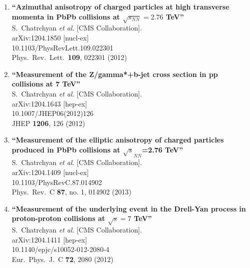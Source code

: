\documentclass{article}
\begin{document}
\begin{enumerate}
\item%
{\bf ``Azimuthal anisotropy of charged particles at high transverse momenta in PbPb collisions at $\sqrt{s_{NN}}=2.76$ TeV''}
  \\{}S.~Chatrchyan {\it et al.}  [CMS Collaboration].
  \\{}arXiv:1204.1850 [nucl-ex]
    \\{}10.1103/PhysRevLett.109.022301
\\{}Phys.\ Rev.\ Lett.\  {\bf 109}, 022301 (2012) %


\item%
{\bf ``Measurement of the Z/gamma*+b-jet cross section in pp collisions at 7 TeV''}
  \\{}S.~Chatrchyan {\it et al.}  [CMS Collaboration].
  \\{}arXiv:1204.1643 [hep-ex]
    \\{}10.1007/JHEP06(2012)126
\\{}JHEP {\bf 1206}, 126 (2012) %


\item%
{\bf ``Measurement of the elliptic anisotropy of charged particles produced in PbPb collisions at $\sqrt{s}_{NN}$=2.76 TeV''}
  \\{}S.~Chatrchyan {\it et al.}  [CMS Collaboration].
  \\{}arXiv:1204.1409 [nucl-ex]
    \\{}10.1103/PhysRevC.87.014902
\\{}Phys.\ Rev.\ C {\bf 87}, no. 1, 014902 (2013) %


\item%
{\bf ``Measurement of the underlying event in the Drell-Yan process in proton-proton collisions at $\sqrt{s}=7$ TeV''}
  \\{}S.~Chatrchyan {\it et al.}  [CMS Collaboration].
  \\{}arXiv:1204.1411 [hep-ex]
    \\{}10.1140/epjc/s10052-012-2080-4
\\{}Eur.\ Phys.\ J.\ C {\bf 72}, 2080 (2012) %



\end{enumerate}
\end{document}
